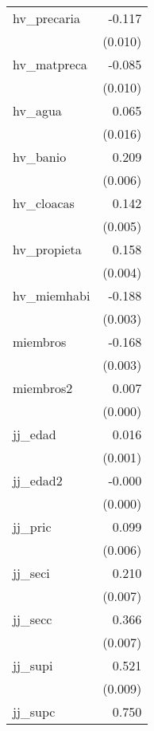 {\begin{longtable}{l*{1}{D{.}{.}{-1}}}
hv\_precaria &      -0.117\sym{***}\\
            &     (0.010)         \\
\addlinespace
hv\_matpreca &      -0.085\sym{***}\\
            &     (0.010)         \\
\addlinespace
hv\_agua     &       0.065\sym{***}\\
            &     (0.016)         \\
\addlinespace
hv\_banio    &       0.209\sym{***}\\
            &     (0.006)         \\
\addlinespace
hv\_cloacas  &       0.142\sym{***}\\
            &     (0.005)         \\
\addlinespace
hv\_propieta &       0.158\sym{***}\\
            &     (0.004)         \\
\addlinespace
hv\_miemhabi &      -0.188\sym{***}\\
            &     (0.003)         \\
\addlinespace
miembros    &      -0.168\sym{***}\\
            &     (0.003)         \\
\addlinespace
miembros2   &       0.007\sym{***}\\
            &     (0.000)         \\
\addlinespace
jj\_edad     &       0.016\sym{***}\\
            &     (0.001)         \\
\addlinespace
jj\_edad2    &      -0.000\sym{***}\\
            &     (0.000)         \\
\addlinespace
jj\_pric     &       0.099\sym{***}\\
            &     (0.006)         \\
\addlinespace
jj\_seci     &       0.210\sym{***}\\
            &     (0.007)         \\
\addlinespace
jj\_secc     &       0.366\sym{***}\\
            &     (0.007)         \\
\addlinespace
jj\_supi     &       0.521\sym{***}\\
            &     (0.009)         \\
\addlinespace
jj\_supc     &       0.750\sym{***}\\

\end{longtable}}
